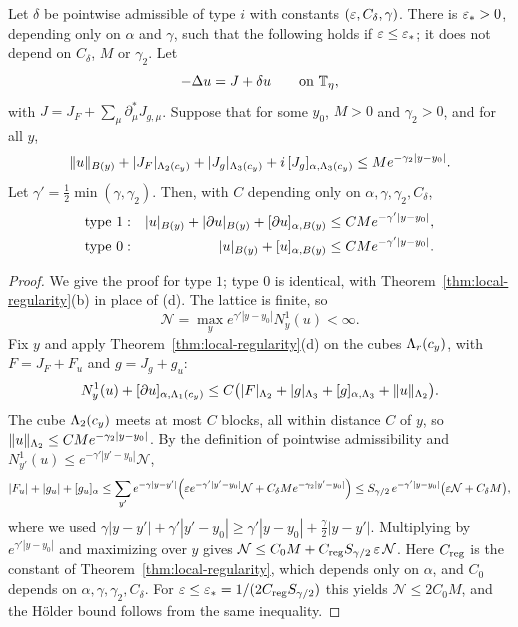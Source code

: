 \begin{lemma}[Bootstrap]\label{lem:bootstrap}
Let $\delta$ be pointwise admissible of type $i$ with constants $(\varepsilon,C_\delta,\gamma)$. There is $\varepsilon_*>0$, depending only on $\alpha$ and $\gamma$, such that the following holds if $\varepsilon\le\varepsilon_*$; it does not depend on $C_\delta$, $M$ or $\gamma_2$. Let
\[
-\Delta u=J+\delta u\qquad\text{on }\mathbb T_\eta,
\]
with $J=J_F+\sum_\mu\partial^*_\mu J_{g,\mu}$. Suppose that for some $y_0$, $M>0$ and $\gamma_2>0$, and for all $y$,
\[
\|u\|_{B(y)}+|J_F|_{\Lambda_2(c_y)}+|J_g|_{\Lambda_3(c_y)}+i\,[J_g]_{\alpha,\Lambda_3(c_y)}\le Me^{-\gamma_2|y-y_0|}.
\]
Let $\gamma'=\frac12\min(\gamma,\gamma_2)$. Then, with $C$ depending only on $\alpha,\gamma,\gamma_2,C_\delta$,
\begin{align*}
&\text{type }1: & |u|_{B(y)}+|\partial u|_{B(y)}+[\partial u]_{\alpha,B(y)}&\le CMe^{-\gamma'|y-y_0|},\\
&\text{type }0: & |u|_{B(y)}+[u]_{\alpha,B(y)}&\le CMe^{-\gamma'|y-y_0|}.
\end{align*}
\end{lemma}

\begin{proof}
We give the proof for type $1$; type $0$ is identical, with Theorem~\ref{thm:local-regularity}(b) in place of (d). The lattice is finite, so
\[
\mathcal N=\max_ye^{\gamma'|y-y_0|}N^1_y(u)<\infty .
\]
Fix $y$ and apply Theorem~\ref{thm:local-regularity}(d) on the cubes $\Lambda_r(c_y)$, with $F=J_F+F_u$ and $g=J_g+g_u$:
\[
N^1_y(u)+[\partial u]_{\alpha,\Lambda_1(c_y)}\le C\big(|F|_{\Lambda_2}+|g|_{\Lambda_3}+[g]_{\alpha,\Lambda_3}+\|u\|_{\Lambda_2}\big).
\]
The cube $\Lambda_2(c_y)$ meets at most $C$ blocks, all within distance $C$ of $y$, so $\|u\|_{\Lambda_2}\le CMe^{-\gamma_2|y-y_0|}$. By the definition of pointwise admissibility and $N^1_{y'}(u)\le e^{-\gamma'|y'-y_0|}\mathcal N$,
\[
|F_u|+|g_u|+[g_u]_\alpha\le\sum_{y'}e^{-\gamma|y-y'|}\Big(\varepsilon e^{-\gamma'|y'-y_0|}\mathcal N+C_\delta Me^{-\gamma_2|y'-y_0|}\Big)\le S_{\gamma/2}\,e^{-\gamma'|y-y_0|}\big(\varepsilon\mathcal N+C_\delta M\big),
\]
where we used $\gamma|y-y'|+\gamma'|y'-y_0|\ge\gamma'|y-y_0|+\frac\gamma2|y-y'|$. Multiplying by $e^{\gamma'|y-y_0|}$ and maximizing over $y$ gives $\mathcal N\le C_0M+C_{\rm reg}S_{\gamma/2}\,\varepsilon\,\mathcal N$. Here $C_{\rm reg}$ is the constant of Theorem~\ref{thm:local-regularity}, which depends only on $\alpha$, and $C_0$ depends on $\alpha,\gamma,\gamma_2,C_\delta$. For $\varepsilon\le\varepsilon_*=1/(2C_{\rm reg}S_{\gamma/2})$ this yields $\mathcal N\le2C_0M$, and the H\"older bound follows from the same inequality.
\end{proof}

